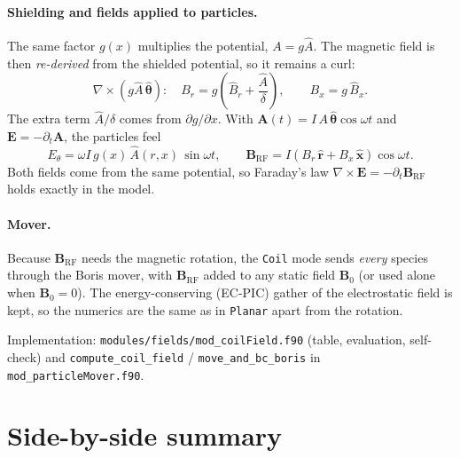 \documentclass[11pt,a4paper]{article}
\newcommand{\Ahat}{\hat{A}}
\newcommand{\code}[1]{\texttt{#1}}
\begin{document}
\paragraph{Shielding and fields applied to particles.} The same factor $g(x)$
multiplies the potential, $A = g\Ahat$. The magnetic field is then
\emph{re-derived} from the shielded potential, so it remains a curl:
\begin{equation}
  \nabla\times(g\Ahat\,\hat{\boldsymbol\theta}) :\quad
  B_r = g\left(\hat B_r + \frac{\Ahat}{\delta}\right), \qquad
  B_x = g\,\hat B_x .
\end{equation}
The extra term $\Ahat/\delta$ comes from $\partial g/\partial x$. With
$\mathbf{A}(t) = I\,A\,\hat{\boldsymbol\theta}\cos\omega t$ and $\mathbf E =
-\partial_t \mathbf A$, the particles feel
\begin{equation}
  E_\theta = \omega I\, g(x)\,\Ahat(r,x)\,\sin\omega t, \qquad
  \mathbf{B}_{\mathrm{RF}} = I\left(B_r\,\hat{\mathbf r} + B_x\,\hat{\mathbf x}\right)\cos\omega t .
  \label{eq:coil}
\end{equation}
Both fields come from the same potential, so Faraday's law
$\nabla\times\mathbf E = -\partial_t\mathbf B_{\mathrm{RF}}$ holds exactly in
the model.

\paragraph{Mover.} Because $\mathbf{B}_{\mathrm{RF}}$ needs the magnetic
rotation, the \code{Coil} mode sends \emph{every} species through the Boris
mover, with $\mathbf{B}_{\mathrm{RF}}$ added to any static field $\mathbf{B}_0$
(or used alone when $\mathbf B_0 = 0$). The energy-conserving (EC-PIC)
gather of the electrostatic field is kept, so the numerics are the same as in
\code{Planar} apart from the rotation.

Implementation: \code{modules/fields/mod\_coilField.f90} (table, evaluation,
self-check) and \code{compute\_coil\_field} /
\code{move\_and\_bc\_boris} in \code{mod\_particleMover.f90}.

\section{Side-by-side summary}
\end{document}
